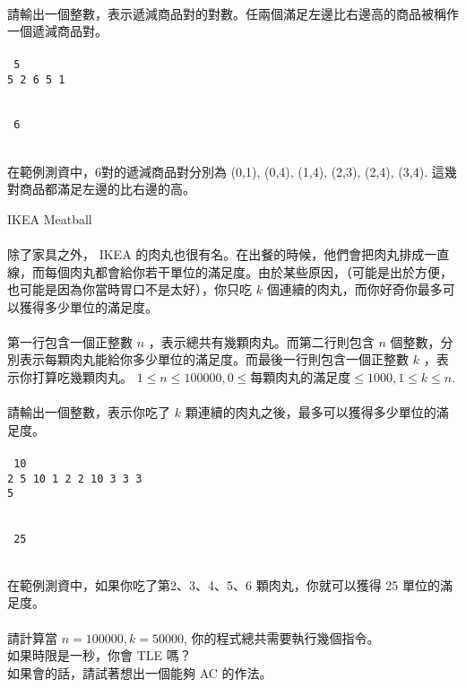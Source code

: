 \documentclass{article}
\begin{document}
\\
    請輸出一個整數，表示遞減商品對的對數。任兩個滿足左邊比右邊高的商品被稱作一個遞減商品對。\\

\\
    \texttt{
        5\\
        5 2 6 5 1\\
    }

\\
    \texttt{
        6\\
    }

\\
    在範例測資中，6對的遞減商品對分別為 (0,1), (0,4), (1,4), (2,3), (2,4), (3,4). 這幾對商品都滿足左邊的比右邊的高。\\
\newpage

{\huge IKEA Meatball}\\

\\
    除了家具之外， IKEA 的肉丸也很有名。在出餐的時候，他們會把肉丸排成一直線，而每個肉丸都會給你若干單位的滿足度。由於某些原因，（可能是出於方便，也可能是因為你當時胃口不是太好），你只吃 $k$ 個連續的肉丸，而你好奇你最多可以獲得多少單位的滿足度。\\

\\
    第一行包含一個正整數 $n$ ，表示總共有幾顆肉丸。而第二行則包含 $n$ 個整數，分別表示每顆肉丸能給你多少單位的滿足度。而最後一行則包含一個正整數 $k$ ，表示你打算吃幾顆肉丸。
    $1\leq n\leq 100000, 0\leq \text{每顆肉丸的滿足度}\leq 1000, 1\leq k\leq n$.\\

\\
    請輸出一個整數，表示你吃了 $k$ 顆連續的肉丸之後，最多可以獲得多少單位的滿足度。\\

\\
    \texttt{
        10\\
        2 5 10 1 2 2 10 3 3 3\\
        5\\
    }


\\
    \texttt{
        25\\
    }

\\
    在範例測資中，如果你吃了第2、3、4、5、6 顆肉丸，你就可以獲得 25 單位的滿足度。\\

\\
    請計算當 \(n=100000, k=50000\), 你的程式總共需要執行幾個指令。\\
    如果時限是一秒，你會 TLE 嗎？\\
    如果會的話，請試著想出一個能夠 AC 的作法。\\
\newpage
\end{document}
